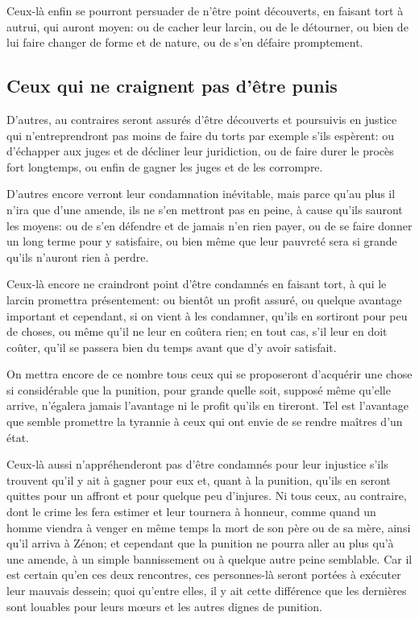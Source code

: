 Ceux-là enfin se pourront persuader de n'être point découverts, en faisant tort à autrui, qui auront moyen: ou
de cacher leur larcin, ou de le détourner, ou bien de lui faire changer de forme et de nature, ou de s'en défaire
promptement.

\subsection{Ceux qui ne craignent pas d'être punis}

D'autres, au contraires seront assurés d'être découverts et poursuivis en justice qui n'entreprendront pas moins
de faire du torts par exemple s'ils espèrent: ou d'échapper aux juges et de décliner leur juridiction, ou de
faire durer le procès fort longtemps, ou enfin de gagner les juges et de les corrompre.

\bigbreak

D'autres encore verront leur condamnation inévitable, mais parce qu'au plus il n'ira que d'une amende, ils ne s'en
mettront pas en peine, à cause qu'ils sauront les moyens: ou de s'en défendre et de jamais n'en rien payer, ou de
se faire donner un long terme pour y satisfaire, ou bien même que leur pauvreté sera si grande qu'ils n'auront rien
à perdre.

Ceux-là encore ne craindront point d'être condamnés en faisant tort, à qui le larcin promettra présentement: ou
bientôt un profit assuré, ou quelque avantage important et cependant, si on vient à les condamner, qu'ils en
sortiront pour peu de choses, ou même qu'il ne leur en coûtera rien; en tout cas, s'il leur en doit coûter, qu'il
se passera bien du temps avant que d'y avoir satisfait. 

On mettra encore de ce nombre tous ceux qui se proposeront d'acquérir une chose si considérable que la punition,
pour grande quelle soit, supposé même qu'elle arrive, n'égalera jamais l'avantage ni le profit qu'ils en tireront.
Tel est l'avantage que semble promettre la tyrannie à ceux qui ont envie de se rendre maîtres d'un état.

Ceux-là aussi n'appréhenderont pas d'être condamnés pour leur injustice s'ils trouvent qu'il y ait à gagner pour
eux et, quant à la punition, qu'ils en seront quittes pour un affront et pour quelque peu d'injures. Ni tous ceux,
au contraire, dont le crime les fera estimer et leur tournera à honneur, comme quand un homme viendra à venger en
même temps la mort de son père ou de sa mère, ainsi qu'il arriva à Zénon; et cependant que la punition ne pourra
aller au plus qu'à une amende, à un simple bannissement ou à quelque autre peine semblable. Car il est certain
qu'en ces deux rencontres, ces personnes-là seront portées à exécuter leur mauvais dessein; quoi qu'entre elles,
il y ait cette différence que les dernières sont louables pour leurs mœurs et les autres dignes de punition.

